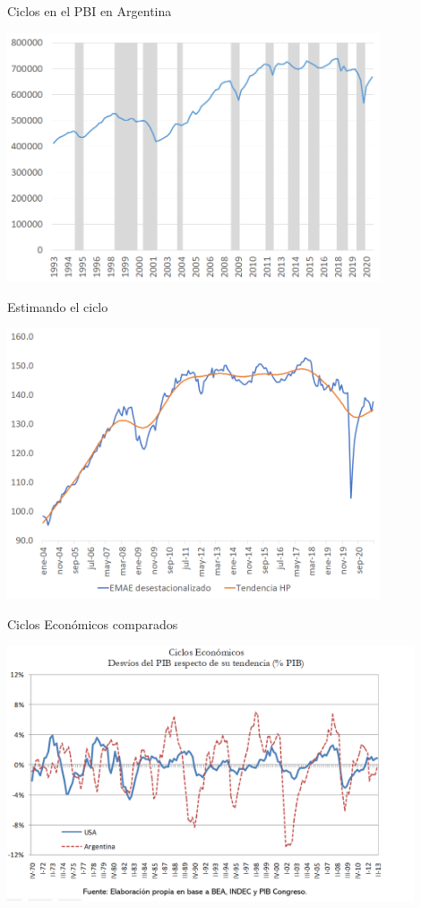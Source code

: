 \documentclass{beamer}
\begin{document}
\begin{frame}{Ciclos en el PBI en Argentina}

\centering\includegraphics[width=11cm]{Figures/ARG_Rec.png}\

\end{frame}


\begin{frame}{ Estimando el ciclo}

\centering\includegraphics[width=11cm]{Figures/G9.png}\

\end{frame}


\begin{frame}{ Ciclos Económicos comparados}

\centering\includegraphics[width=12cm]{Figures/P12.png}\

\end{frame}
\end{document}
